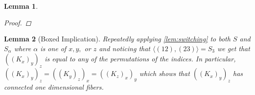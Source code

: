 \documentclass{article}
\newcommand{\sxyz}{((K_x)_y)_z}
\newcommand{\Sxyz}[3]{((K_#1)_#2)_#3}
\theoremstyle{mystyle}
\newtheorem{lem}{Lemma}[section]
\theoremstyle{remark}
\begin{document}
\begin{lem}
\begin{proof}
    \end{proof}

\end{lem}

\begin{lem}
    [Boxed Implication]
 \label{lem:boximp} 
    Repeatedly applying \ref{lem:switching} to both \(S\) and \(S_{\alpha}\) where \(\alpha\) is one of \(x,y,\) or \(z\)  and noticing that \(\langle (12),(23) \rangle = S_{3}\) we get that \(\sxyz\) is equal to any of the permutations of the indices. In particular, \(\Sxyz{x}{y}{z}=\Sxyz{y}{z}{x}=\Sxyz{z}{x}{y}\) which shows that \(\sxyz\) has connected one dimensional fibers.
\end{lem}
\end{document}

